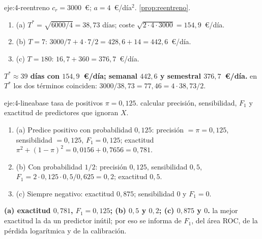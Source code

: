 \begin{solucion}{eje:4-reentreno}
\datos $c_r=3000$~€; $a=4$~€/día$^{2}$.
\planteamiento \cref{prop:reentreno}.
\pasos
\begin{enumerate}[label=\arabic*.]
  \item (a) $T^{*}=\sqrt{6000/4}=38{,}73$ días; coste $\sqrt{2\cdot4\cdot3000}=154{,}9$~€/día.
  \item (b) $T=7$: $3000/7+4\cdot7/2=428{,}6+14=442{,}6$~€/día.
  \item (c) $T=180$: $16{,}7+360=376{,}7$~€/día.
\end{enumerate}
\resultado \textbf{$T^{*}\approx39$ días con $154{,}9$~€/día; semanal $442{,}6$ y semestral $376{,}7$~€/día.}
\comprobacion en $T^{*}$ los dos términos coinciden: $3000/38{,}73=77{,}46=4\cdot38{,}73/2$.
\end{solucion}

\begin{solucion}{eje:4-lineabase}
\datos tasa de positivos $\pi=0{,}125$.
\planteamiento calcular precisión, sensibilidad, $F_1$ y exactitud de predictores que ignoran $X$.
\pasos
\begin{enumerate}[label=\arabic*.]
  \item (a) Predice positivo con probabilidad $0{,}125$: precisión $=\pi=0{,}125$, sensibilidad $=0{,}125$, $F_1=0{,}125$; exactitud $\pi^{2}+(1-\pi)^{2}=0{,}0156+0{,}7656=0{,}781$.
  \item (b) Con probabilidad $1/2$: precisión $0{,}125$, sensibilidad $0{,}5$, $F_1=2\cdot0{,}125\cdot0{,}5/0{,}625=0{,}2$; exactitud $0{,}5$.
  \item (c) Siempre negativo: exactitud $0{,}875$; sensibilidad $0$ y $F_1=0$.
\end{enumerate}
\resultado \textbf{(a) exactitud $0{,}781$, $F_1=0{,}125$; (b) $0{,}5$ y $0{,}2$; (c) $0{,}875$ y $0$.}
\comprobacion la mejor exactitud la da un predictor inútil; por eso se informa de $F_1$, del área ROC, de la pérdida logarítmica y de la calibración.
\end{solucion}

